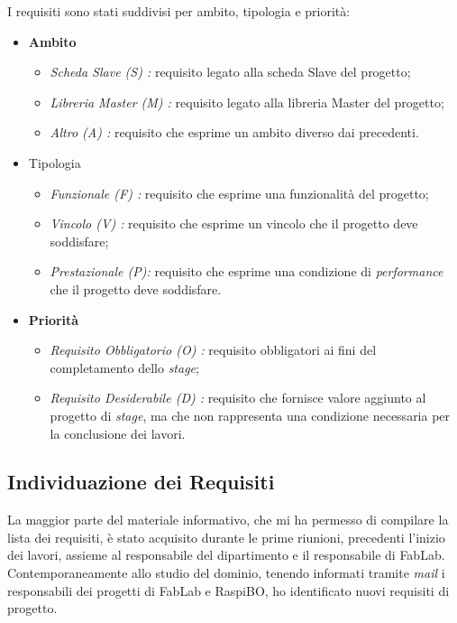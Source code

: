 I requisiti sono stati suddivisi per ambito, tipologia e priorità:
\begin{itemize}
	
	\item \textbf{Ambito}
		\begin{itemize}
			\item \textit{Scheda Slave (S) :} requisito legato alla scheda Slave del progetto;
			\item \textit{Libreria Master (M) :} requisito legato alla libreria Master del progetto;
			\item \textit{Altro (A) :} requisito che esprime un ambito diverso dai precedenti.
		\end{itemize}
	\item Tipologia
		\begin{itemize}
			\item \textit{Funzionale (F) :} requisito che esprime una funzionalità del progetto;
			\item \textit{Vincolo (V) :} requisito che esprime un vincolo che il progetto deve soddisfare;
			\item \textit{Prestazionale (P):} requisito che esprime una condizione di \textit{performance} che il progetto deve soddisfare.
		\end{itemize}
		\item  \textbf{Priorità}
		\begin{itemize}
			\item \textit{Requisito Obbligatorio (O) :} requisito obbligatori ai fini del completamento dello \textit{stage};
			\item \textit{Requisito Desiderabile (D) :} requisito che fornisce valore aggiunto al progetto di \textit{stage}, ma che non rappresenta una condizione necessaria per la conclusione dei lavori.
		\end{itemize} 
\end{itemize}

\subsection{Individuazione dei Requisiti}

La maggior parte del materiale informativo, che mi ha permesso di compilare la lista dei requisiti, è stato acquisito durante le prime riunioni, precedenti l'inizio dei lavori, assieme al responsabile del dipartimento e il responsabile di FabLab.
Contemporaneamente allo studio del dominio, tenendo informati tramite \textit{mail} i responsabili dei progetti di FabLab e RaspiBO, ho identificato nuovi requisiti di progetto. 


